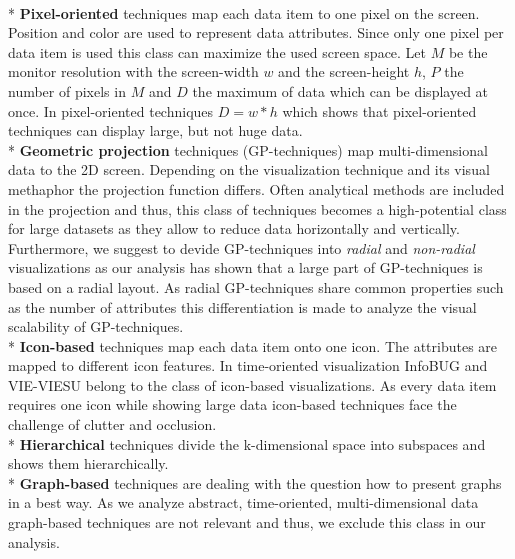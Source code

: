 \\*
\textbf{Pixel-oriented} techniques map each data item to one pixel on the screen. Position and color are used to represent data attributes\cite{Keim1996}.
Since only one pixel per data item is used this class can maximize the used screen space. 
Let $M$ be the monitor resolution with the screen-width $w$ and the screen-height $h$, $P$ the number of pixels in $M$ and $D$ the maximum of data which can be displayed at once. In pixel-oriented techniques  
\begin{math}
D = w*h
\end{math}
which shows that pixel-oriented techniques can display large, but not huge data.  
\\*
\textbf{Geometric projection} techniques (GP-techniques) map multi-dimensional data to the 2D screen\cite{FerreiradeOliveira2003}. Depending on the visualization technique and its visual methaphor the projection function differs. Often analytical methods are included in the projection and thus, this class of techniques becomes a high-potential class for large datasets as they allow to reduce data horizontally and vertically.
Furthermore, we suggest to devide GP-techniques into \textit{radial} and \textit{non-radial} visualizations\cite{Diehl2010} as our analysis has shown that a large part of GP-techniques is based on a radial layout. As radial GP-techniques share common properties such as the number of attributes this differentiation is made to analyze the visual scalability of GP-techniques.
\\*
\textbf{Icon-based} techniques map each data item onto one icon. The attributes are mapped to different icon features\cite{Keim2001}. In time-oriented visualization InfoBUG and VIE-VIESU belong to the class of icon-based visualizations. As every data item requires one icon while showing large data icon-based techniques face the challenge of clutter and occlusion\cite{Borgo2013}.
\\*
\textbf{Hierarchical} techniques divide the k-dimensional space into subspaces and shows them hierarchically. 
\\*
\textbf{Graph-based} techniques are dealing with the question how to present graphs in a best way. As we analyze abstract, time-oriented, multi-dimensional data graph-based techniques are not relevant and thus, we exclude this class in our analysis. 


